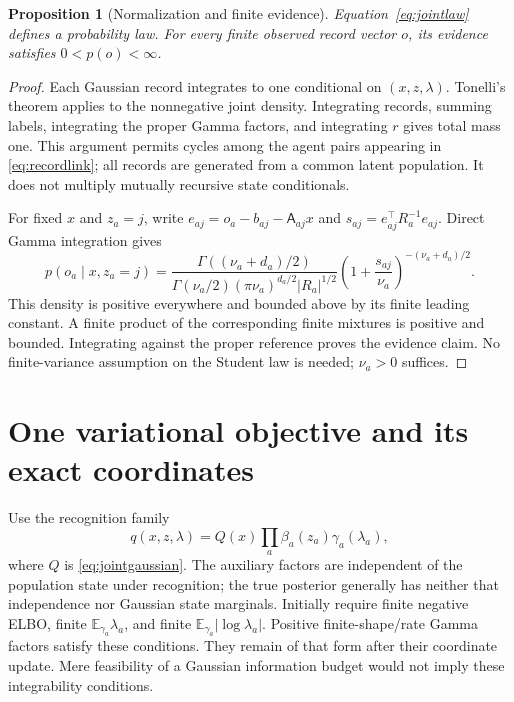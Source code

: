 \documentclass[11pt]{article}
\newtheorem{proposition}[theorem]{Proposition}
\newcommand{\E}{\mathbb E}
\begin{document}
\begin{proposition}[Normalization and finite evidence]
\label{prop:normalization}
Equation~\eqref{eq:jointlaw} defines a probability law. For every finite observed record vector $o$, its evidence satisfies $0<p(o)<\infty$.
\end{proposition}
\begin{proof}
Each Gaussian record integrates to one conditional on $(x,z,\lambda)$. Tonelli's theorem applies to the nonnegative joint density. Integrating records, summing labels, integrating the proper Gamma factors, and integrating $r$ gives total mass one. This argument permits cycles among the agent pairs appearing in \eqref{eq:recordlink}; all records are generated from a common latent population. It does not multiply mutually recursive state conditionals.

For fixed $x$ and $z_a=j$, write $e_{aj}=o_a-b_{aj}-\mathsf A_{aj}x$ and $s_{aj}=e_{aj}^{\top}R_a^{-1}e_{aj}$. Direct Gamma integration gives
\begin{equation}
p(o_a\mid x,z_a=j)=
\frac{\Gamma((\nu_a+d_a)/2)}{\Gamma(\nu_a/2)(\pi\nu_a)^{d_a/2}|R_a|^{1/2}}
\left(1+\frac{s_{aj}}{\nu_a}\right)^{-(\nu_a+d_a)/2}.
\label{eq:student}
\end{equation}
This density is positive everywhere and bounded above by its finite leading constant. A finite product of the corresponding finite mixtures is positive and bounded. Integrating against the proper reference proves the evidence claim. No finite-variance assumption on the Student law is needed; $\nu_a>0$ suffices.
\end{proof}

\section{One variational objective and its exact coordinates}
\label{sec:coordinates}

Use the recognition family
\begin{equation}
q(x,z,\lambda)=Q(x)\prod_a\beta_a(z_a)\gamma_a(\lambda_a),
\label{eq:recognition}
\end{equation}
where $Q$ is \eqref{eq:jointgaussian}. The auxiliary factors are independent of the population state under recognition; the true posterior generally has neither that independence nor Gaussian state marginals. Initially require finite negative ELBO, finite $\E_{\gamma_a}\lambda_a$, and finite $\E_{\gamma_a}|\log\lambda_a|$. Positive finite-shape/rate Gamma factors satisfy these conditions. They remain of that form after their coordinate update. Mere feasibility of a Gaussian information budget would not imply these integrability conditions.
\end{document}
